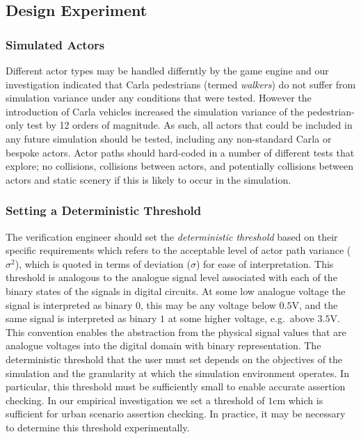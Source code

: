 \documentclass[letterpaper, 10 pt, journal, twoside]{IEEEtran}
\begin{document}
\subsection{Design Experiment}\label{s:design_experiment}

\subsubsection{Simulated Actors} \label{s:actors}

Different actor types may be handled differntly by the game engine and our investigation indicated that Carla pedestrians (termed \textit{walkers}) do not suffer from simulation variance under any conditions that were tested. However the introduction of Carla vehicles increased the simulation variance of the pedestrian-only test by 12 orders of magnitude. As such, all actors that could be included in any future simulation should be tested, including any non-standard Carla or bespoke actors.
%
Actor paths should hard-coded in a number of different tests that explore; no collisions, collisions between actors, and potentially collisions between actors and static scenery if this is likely to occur in the simulation.

\subsubsection{Setting a Deterministic Threshold} \label{s:threshold}
The verification engineer should set the \textit{deterministic threshold} based on their specific requirements which refers to the acceptable level of actor path variance ($\sigma^2$), which is quoted in terms of deviation ($\sigma$) for ease of interpretation. This threshold is analogous to the analogue signal level associated with each of the binary states of the signals in digital circuits. At some low analogue voltage the signal is interpreted as binary $0$, this may be any voltage below $0.5$V, and the same signal is interpreted as binary $1$ at some higher voltage, e.g.\ above $3.5$V. This convention enables the abstraction from the physical signal values that are analogue voltages into the digital domain with binary representation. 
%
The deterministic threshold that the user must set depends on the objectives of the simulation and the granularity at which the simulation environment operates. In particular, this threshold must be sufficiently small to enable accurate assertion checking. In our empirical investigation we set a threshold of $1$cm which is sufficient for urban scenario assertion checking. In practice, it may be necessary to determine this threshold experimentally. 
\end{document}
